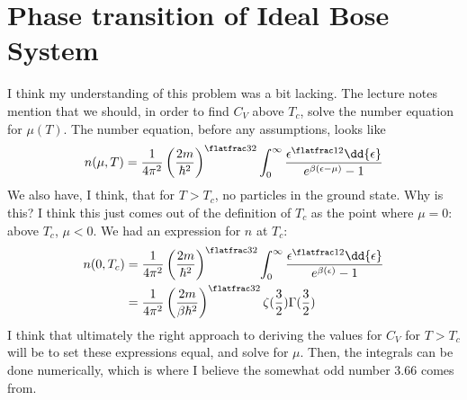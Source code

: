 \documentclass[../../PS3.tex]{subfiles}
\begin{document}
\section{Phase transition of Ideal Bose System}

I think my understanding of this problem was a bit lacking. The lecture notes mention that we should, in order to find $C_V$ above $T_c$, solve the number equation for $\mu(T)$. The number equation, before any assumptions, looks like
\begin{align}
	n(\mu, T) = \frac{1}{4\pi^2} \left( \frac{2m}{\hbar^2}\right)^{\flatfrac32} \int_0^\infty \frac{\epsilon^{\flatfrac12} \dd{\epsilon}}{e^{\beta(\epsilon - \mu)} - 1}
\end{align}
We also have, I think, that for $T > T_c$, no particles in the ground state. Why is this? I think this just comes out of the definition of $T_c$ as the point where $\mu = 0$: above $T_c$, $\mu < 0$. We had an expression for $n$ at $T_c$:
\begin{align}
	n(0, T_c) &= \frac{1}{4\pi^2} \left( \frac{2m}{\hbar^2} \right)^{\flatfrac32} \int_0^\infty \frac{\epsilon^{\flatfrac12} \dd{\epsilon}}{e^{\beta(\epsilon)} - 1} \\
	&= \frac{1}{4\pi^2} \left( \frac{2m}{\beta \hbar^2} \right)^{\flatfrac32} \zeta (\frac{3}{2} ) \Gamma(\frac{3}{2} )
\end{align}
I think that ultimately the right approach to deriving the values for $C_V$ for $T > T_c$ will be to set these expressions equal, and solve for $\mu$. Then, the integrals can be done numerically, which is where I believe the somewhat odd number $3.66$ comes from.
\end{document}
